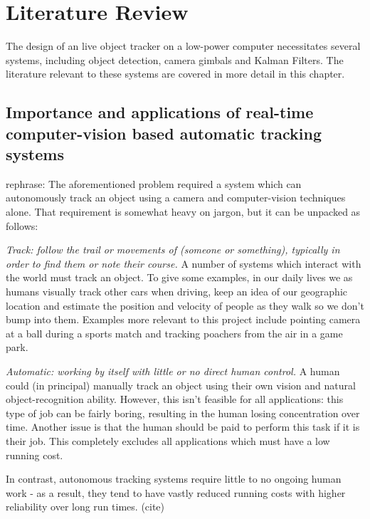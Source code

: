 \chapter{Literature Review}

The design of an live object tracker on a low-power computer necessitates several systems, including object detection, camera gimbals and Kalman Filters. The literature relevant to these systems are covered in more detail in this chapter.

\section{Importance and applications of real-time computer-vision based automatic tracking systems}\label{sec:compare_cv_techniques}
{\color{red} rephrase:} The aforementioned problem required a system which can autonomously track an object using a camera and computer-vision techniques alone. That requirement is somewhat heavy on jargon, but it can be unpacked as follows:



\textit{Track: follow the trail or movements of (someone or something), typically in order to find them or note their course.}
%
A number of systems which interact with the world must track an object. To give some examples, in our daily lives we as humans visually track other cars when driving, keep an idea of our geographic location and estimate the position and velocity of people as they walk so we don't bump into them. Examples more relevant to this project include pointing camera at a ball during a sports match and tracking poachers from the air in a game park.


\textit{Automatic: working by itself with little or no direct human control.}
%
A human could (in principal) manually track an object using their own vision and natural object-recognition ability. However, this isn't feasible for all applications: this type of job can be fairly boring, resulting in the human losing concentration over time. Another issue is that the human should be paid to perform this task if it is their job. This completely excludes all applications which must have a low running cost.

In contrast, autonomous tracking systems require little to no ongoing human work - as a result, they tend to have vastly reduced running costs with higher reliability over long run times. {\color{red} (cite)}


